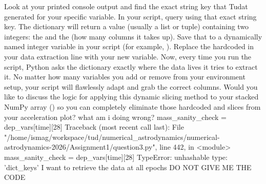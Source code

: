 {}\markdownRendererOlBegin
{} Look at your printed console output and find the exact string key that Tudat generated for your specific variable.\markdownRendererOlItemEnd 
{} In your script, query  using that exact string key. The dictionary will return a value (usually a list or tuple) containing two integers: the  and the  (how many columns it takes up).\markdownRendererOlItemEnd 
{} Save that  to a dynamically named integer variable in your script (for example, ).\markdownRendererOlItemEnd 
{} Replace the hardcoded \markdownRendererCodeSpan{[28]} in your data extraction line with your new  variable.\markdownRendererOlItemEnd 
\markdownRendererOlEnd \markdownRendererInterblockSeparator
{}Now, every time you run the script, Python asks the dictionary exactly where the data lives  it tries to extract it. No matter how many variables you add or remove from your environment setup, your script will flawlessly adapt and grab the correct columns.\markdownRendererInterblockSeparator
{}\markdownRendererThematicBreak{}\markdownRendererInterblockSeparator
{}Would you like to discuss the logic for applying this dynamic slicing method to your stacked NumPy array () so you can completely eliminate those hardcoded \markdownRendererCodeSpan{[:, 9:12]} and \markdownRendererCodeSpan{[:, 12:15]} slices from your acceleration plot?\markdownRendererInterblockSeparator
{}\markdownRendererThematicBreak{}\markdownRendererInterblockSeparator
{}
\markdownRendererSectionEnd 
\markdownRendererSectionEnd \markdownRendererSectionBegin
{}\markdownRendererInterblockSeparator
{}what am i doing wrong? mass_sanity_check = dep_vars[time][28] Traceback (most recent call last): File "/home/ismag/workspace/tud/numerical_astrodynamics/numerical-astrodynamics-2026/Assignment1/question3.py", line 442, in <module> mass_sanity_check = dep_vars[time][28] TypeError: unhashable type: 'dict_keys' I want to retrieve the data at all epochs DO NOT GIVE ME THE CODE\markdownRendererInterblockSeparator
